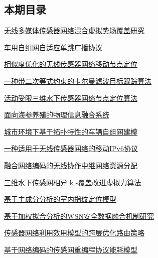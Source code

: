\documentclass[a4paper]{article}
\begin{document}
\subsection{本期目录}
\href{http://www.jos.org.cn/ch/reader/download_pdf.aspx?file_no=13001&year_id=2013&quarter_id=S1&falg=1}{无线多媒体传感器网络混合虚拟势场覆盖研究}

\href{http://www.jos.org.cn/ch/reader/download_pdf.aspx?file_no=13002&year_id=2013&quarter_id=S1&falg=1}{车用自组网自适应单跳广播协议}

\href{http://www.jos.org.cn/ch/reader/download_pdf.aspx?file_no=13003&year_id=2013&quarter_id=S1&falg=1}{相似度优化的无线传感器网络移动节点定位}

\href{http://www.jos.org.cn/ch/reader/download_pdf.aspx?file_no=13004&year_id=2013&quarter_id=S1&falg=1}{一种带二次等式约束的卡尔曼滤波目标跟踪算法}

\href{http://www.jos.org.cn/ch/reader/download_pdf.aspx?file_no=13005&year_id=2013&quarter_id=S1&falg=1}{活动受限三维水下传感器网络节点定位算法}

\href{http://www.jos.org.cn/ch/reader/download_pdf.aspx?file_no=13006&year_id=2013&quarter_id=S1&falg=1}{面向海参养殖的物理信息融合系统}

\href{http://www.jos.org.cn/ch/reader/download_pdf.aspx?file_no=13007&year_id=2013&quarter_id=S1&falg=1}{城市环境下基于拓扑特性的车辆自组网建模}

\href{http://www.jos.org.cn/ch/reader/download_pdf.aspx?file_no=13008&year_id=2013&quarter_id=S1&falg=1}{一种适用于无线传感器网络的移动IPv6协议}

\href{http://www.jos.org.cn/ch/reader/download_pdf.aspx?file_no=13009&year_id=2013&quarter_id=S1&falg=1}{融合网络编码的无线协作中继网络资源分配}

\href{http://www.jos.org.cn/ch/reader/download_pdf.aspx?file_no=13010&year_id=2013&quarter_id=S1&falg=1}{三维水下传感网相异 k -覆盖改进虚拟力算法}

\href{http://www.jos.org.cn/ch/reader/download_pdf.aspx?file_no=13011&year_id=2013&quarter_id=S1&falg=1}{基于主成分分析的室内指纹定位模型}

\href{http://www.jos.org.cn/ch/reader/download_pdf.aspx?file_no=13012&year_id=2013&quarter_id=S1&falg=1}{基于加权拟合分析的WSN安全数据融合机制研究}

\href{http://www.jos.org.cn/ch/reader/download_pdf.aspx?file_no=13013&year_id=2013&quarter_id=S1&falg=1}{传感器网络利用效用模型的跨层优化路由策略}

\href{http://www.jos.org.cn/ch/reader/download_pdf.aspx?file_no=13014&year_id=2013&quarter_id=S1&falg=1}{基于网络编码的传感网重编程协议能耗模型}
\end{document}
